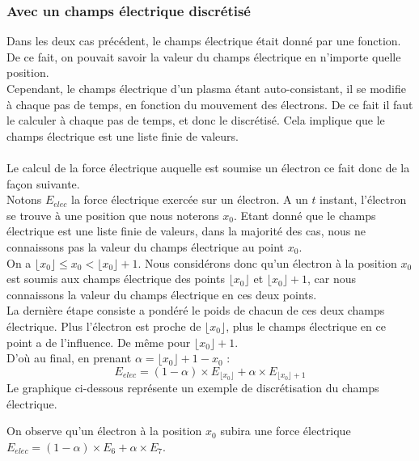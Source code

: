 \documentclass{article}
\begin{document}
\subsubsection*{Avec un champs électrique discrétisé}
Dans les deux cas précédent, le champs électrique était donné par une fonction. De ce fait, on pouvait savoir la valeur du champs électrique en n'importe quelle position.\\
Cependant, le champs électrique d'un plasma étant auto-consistant, il se modifie à chaque pas de temps, en fonction du mouvement des électrons. De ce fait il faut le calculer à chaque pas de temps, et donc le discrétisé. Cela implique que le champs électrique est une liste finie de valeurs.\\
\\
Le calcul de la force électrique auquelle est soumise un électron ce fait donc de la façon suivante.\\
Notons $E_{elec}$ la force électrique exercée sur un électron. A un $t$ instant, l'électron se trouve à une position que nous noterons $x_0$. Etant donné que le champs électrique est une liste finie de valeurs, dans la majorité des cas, nous ne connaissons pas la valeur du champs électrique au point $x_0$.\\
On a $\lfloor x_0 \rfloor \leq x_0 < \lfloor x_0 \rfloor + 1$. Nous considérons donc qu'un électron à la position $x_0$ est soumis aux champs électrique des points $\lfloor x_0 \rfloor$ et $\lfloor x_0 \rfloor + 1$, car nous connaissons la valeur du champs électrique en ces deux points.\\
La dernière étape consiste a pondéré le poids de chacun de ces deux champs électrique. Plus l'électron est proche de $\lfloor x_0 \rfloor$, plus le champs électrique en ce point a de l'influence. De même pour $\lfloor x_0 \rfloor + 1$.\\
D'où au final, en prenant $\alpha = \lfloor x_0 \rfloor + 1 - x_0$ : $$E_{elec} = (1 - \alpha) \times E_{\lfloor x_0 \rfloor} + \alpha \times E_{\lfloor x_0 \rfloor + 1}$$
Le graphique ci-dessous représente un exemple de discrétisation du champs électrique.
\begin{center}
\end{center}
On observe qu'un électron à la position $x_0$ subira une force électrique $E_{elec} = (1 - \alpha) \times E_6 + \alpha \times E_7$.
\end{document}
